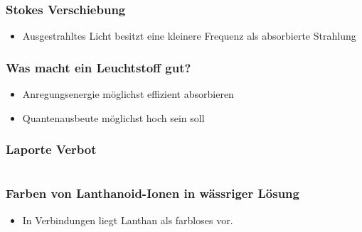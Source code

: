 \documentclass{beamer}
\begin{document}
\begin{frame}
  \frametitle{Stokes Verschiebung}
    \begin{itemize}
    \item Ausgestrahltes Licht besitzt eine kleinere Frequenz als absorbierte Strahlung
    \end{itemize}
  \end{frame}


\begin{frame}[t]\frametitle{Was macht ein Leuchtstoff gut?}
\begin{itemize}
 \item Anregungsenergie möglichst effizient absorbieren
 \item Quantenausbeute möglichst hoch sein soll
\end{itemize}
\end{frame}

  \begin{frame}[t]\frametitle{Laporte Verbot}

\end{frame}
\section{}
  \begin{frame}[t]\frametitle{Farben von Lanthanoid-Ionen in wässriger Lösung}
\begin{itemize}
  \item In Verbindungen liegt Lanthan als farbloses  vor.
\end{itemize}

\end{frame}
\end{document}
